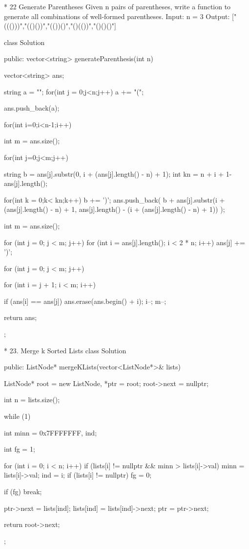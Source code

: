 * 22 Generate Parentheses
	\Problem
		Given n pairs of parentheses, write a function to generate all combinations of well-formed parentheses.
		Input: n = 3
		Output: ["((()))","(()())","(())()","()(())","()()()"]

		class Solution {
		public:
			vector<string> generateParenthesis(int n) {
				vector<string> ans;
				
				string a = "";
				for(int j = 0;j<n;j++){
					a += "(";
				}
				
				ans.push_back(a);
				
				for(int i=0;i<n-1;i++){
					int m = ans.size();
					
					for(int j=0;j<m;j++){
						string b = ans[j].substr(0, i + (ans[j].length() - n) + 1);
						int kn = n + i + 1- ans[j].length();
						
						for(int k = 0;k< kn;k++){
							b += ')';
							ans.push_back(
								b + ans[j].substr(i + (ans[j].length() - n) + 1, ans[j].length() - (i + (ans[j].length() - n) + 1))
							);
						}
					}
				}
				
				int m = ans.size();

				for (int j = 0; j < m; j++) {
					for (int i = ans[j].length(); i < 2 * n; i++) {
						ans[j] += ')';
					}
				}

				for (int j = 0; j < m; j++) {
					for (int i = j + 1; i < m; i++) {

						if (ans[i] == ans[j]) {
							ans.erase(ans.begin() + i);
							i--; m--;
						}
					}
				}
				
				return ans;

			}
		};

* 23. Merge k Sorted Lists
		class Solution {
		public:
			ListNode* mergeKLists(vector<ListNode*>& lists) {
				ListNode* root = new ListNode, *ptr = root;
				root->next = nullptr;

				int n = lists.size();

				while (1) {
					int minn = 0x7FFFFFFF, ind;

					int fg = 1;

					for (int i = 0; i < n; i++) {
						if (lists[i] != nullptr && minn > lists[i]->val) {
							minn = lists[i]->val;
							ind = i;
						}
						if (lists[i] != nullptr)
							fg = 0;
					}

					if (fg)
						break;

					ptr->next = lists[ind];
					lists[ind] = lists[ind]->next;
					ptr = ptr->next;
				}
				return root->next;
			}
		};

